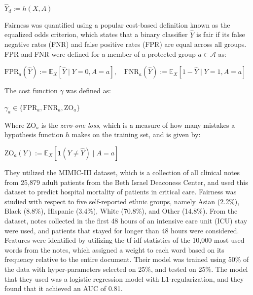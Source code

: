 \documentclass[a4paper]{article}
\begin{document}
\begin{center}
    $\hat{Y}_d := h(X,A)$
\end{center}

Fairness was quantified using a popular cost-based definition known as the equalized odds criterion, which states that a binary classifier \textit{$\hat{Y}$} is fair if its false negative rates (FNR) and false positive rates (FPR) are equal across all groups. FPR and FNR were defined for a member of a protected group $a \in \mathcal{A}$ as:

\begin{center}
    $\text{FPR}_a(\hat{Y}) := \mathbb{E}_X[\hat{Y} \mid Y = 0, A = a], \quad \text{FNR}_a(\hat{Y}) := \mathbb{E}_X[1 - \hat{Y} \mid Y = 1, A = a]$
\end{center}

\noindent The cost function $\gamma$ was defined as:

\begin{center}
    $\gamma_a \in \{\text{FPR}_a, \text{FNR}_a, \text{ZO}_a\}$
\end{center}

Where $\text{ZO}_a$ is the \textit{zero-one loss}, which is a measure of how many mistakes a hypothesis function $h$ makes on the training set, and is given by:

\begin{center}
    $\text{ZO}_a(Y) := \mathbb{E}_X[ \mathbf{1}(Y \neq \hat{Y}) \mid A = a]$
\end{center}

They utilized the MIMIC-III dataset, which is a collection of all clinical notes from 25,879 adult patients from the Beth Israel Deaconess Center, and used this dataset to predict hospital mortality of patients in critical care. Fairness was studied with respect to five self-reported ethnic groups, namely Asian (2.2\%), Black (8.8\%), Hispanic (3.4\%), White (70.8\%), and Other (14.8\%). From the dataset, notes collected in the first 48 hours of an intensive care unit (ICU) stay were used, and patients that stayed for longer than 48 hours were considered. Features were identified by utilizing the tf-idf statistics of the 10,000 most used words from the notes, which assigned a weight to each word based on its frequency relative to the entire document. Their model was trained using 50\% of the data with hyper-parameters selected on 25\%, and tested on 25\%. The model that they used was a logistic regression model with L1-regularization, and they found that it achieved an AUC of 0.81.
\end{document}
